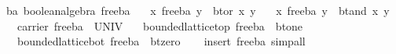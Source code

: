 \begin{isabellebody}
%
\endisadelimproof
\isanewline
{}\isamarkupfalse%
\ ba{}\ boolean{}algebra\ free{}ba\isanewline
\ \ \ {}x\ {}\isactrlbsub free{}ba\isactrlesub \ y\ {}\ bt{}or\ x\ y{}\isanewline
\ \ \ {}x\ {}\isactrlbsub free{}ba\isactrlesub \ y\ {}\ bt{}and\ x\ y{}\isanewline
\ \ \ {}carrier\ free{}ba\ {}\ UNIV{}\isanewline
\ \ \ {}bounded{}lattice{}top\ free{}ba\ {}\ bt{}one{}\isanewline
\ \ \ {}bounded{}lattice{}bot\ free{}ba\ {}\ bt{}zero{}\isanewline
%
\isadelimproof
\ \ %
\endisadelimproof
%
\isatagproof
{}\isamarkupfalse%
\ {}insert\ free{}ba{}\ simp{}all{}%
\endisatagproof
{\isafoldproof}%
%
\isadelimproof
\isanewline
%
\endisadelimproof
%
\isadelimtheory
\isanewline
%
\endisadelimtheory
%
\isatagtheory
{}\isamarkupfalse%
%
\endisatagtheory
{\isafoldtheory}%
%
\isadelimtheory
\isanewline
%
\endisadelimtheory
\end{isabellebody}%
